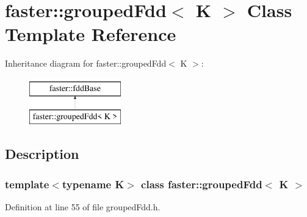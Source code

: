 \hypertarget{classfaster_1_1groupedFdd}{}\section{faster\+:\+:grouped\+Fdd$<$ K $>$ Class Template Reference}
\label{classfaster_1_1groupedFdd}
Inheritance diagram for faster\+:\+:grouped\+Fdd$<$ K $>$\+:\begin{figure}[H]
\begin{center}
\leavevmode
\includegraphics[height=2.000000cm]{classfaster_1_1groupedFdd}
\end{center}
\end{figure}


\subsection{Description}
\subsubsection*{template$<$typename K$>$\newline
class faster\+::grouped\+Fdd$<$ K $>$}



Definition at line 55 of file grouped\+Fdd.\+h.

